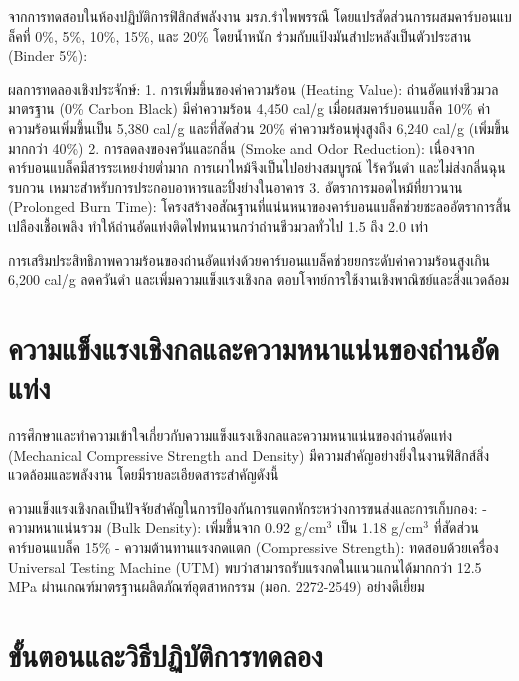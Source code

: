 จากการทดสอบในห้องปฏิบัติการฟิสิกส์พลังงาน มรภ.รำไพพรรณี โดยแปรสัดส่วนการผสมคาร์บอนแบล็คที่ 0\%, 5\%, 10\%, 15\%, และ 20\% โดยน้ำหนัก ร่วมกับแป้งมันสำปะหลังเป็นตัวประสาน (Binder 5\%):

ผลการทดลองเชิงประจักษ์:
1. การเพิ่มขึ้นของค่าความร้อน (Heating Value): ถ่านอัดแท่งชีวมวลมาตรฐาน (0\% Carbon Black) มีค่าความร้อน 4,450 cal/g เมื่อผสมคาร์บอนแบล็ค 10\% ค่าความร้อนเพิ่มขึ้นเป็น 5,380 cal/g และที่สัดส่วน 20\% ค่าความร้อนพุ่งสูงถึง 6,240 cal/g (เพิ่มขึ้นมากกว่า 40\%)
2. การลดลงของควันและกลิ่น (Smoke and Odor Reduction): เนื่องจากคาร์บอนแบล็คมีสารระเหยง่ายต่ำมาก การเผาไหม้จึงเป็นไปอย่างสมบูรณ์ ไร้ควันดำ และไม่ส่งกลิ่นฉุนรบกวน เหมาะสำหรับการประกอบอาหารและปิ้งย่างในอาคาร
3. อัตราการมอดไหม้ที่ยาวนาน (Prolonged Burn Time): โครงสร้างอสัณฐานที่แน่นหนาของคาร์บอนแบล็คช่วยชะลออัตราการสิ้นเปลืองเชื้อเพลิง ทำให้ถ่านอัดแท่งติดไฟทนนานกว่าถ่านชีวมวลทั่วไป 1.5 ถึง 2.0 เท่า

\begin{flamebox}
การเสริมประสิทธิภาพความร้อนของถ่านอัดแท่งด้วยคาร์บอนแบล็คช่วยยกระดับค่าความร้อนสูงเกิน 6,200 cal/g ลดควันดำ และเพิ่มความแข็งแรงเชิงกล ตอบโจทย์การใช้งานเชิงพาณิชย์และสิ่งแวดล้อม
\end{flamebox}

\section{ความแข็งแรงเชิงกลและความหนาแน่นของถ่านอัดแท่ง}

การศึกษาและทำความเข้าใจเกี่ยวกับความแข็งแรงเชิงกลและความหนาแน่นของถ่านอัดแท่ง (Mechanical Compressive Strength and Density) มีความสำคัญอย่างยิ่งในงานฟิสิกส์สิ่งแวดล้อมและพลังงาน โดยมีรายละเอียดสาระสำคัญดังนี้

ความแข็งแรงเชิงกลเป็นปัจจัยสำคัญในการป้องกันการแตกหักระหว่างการขนส่งและการเก็บกอง:
- ความหนาแน่นรวม (Bulk Density): เพิ่มขึ้นจาก 0.92 g/cm$^3$ เป็น 1.18 g/cm$^3$ ที่สัดส่วนคาร์บอนแบล็ค 15\%
- ความต้านทานแรงกดแตก (Compressive Strength): ทดสอบด้วยเครื่อง Universal Testing Machine (UTM) พบว่าสามารถรับแรงกดในแนวแกนได้มากกว่า 12.5 MPa ผ่านเกณฑ์มาตรฐานผลิตภัณฑ์อุตสาหกรรม (มอก. 2272-2549) อย่างดีเยี่ยม

\section{ขั้นตอนและวิธีปฏิบัติการทดลอง}

